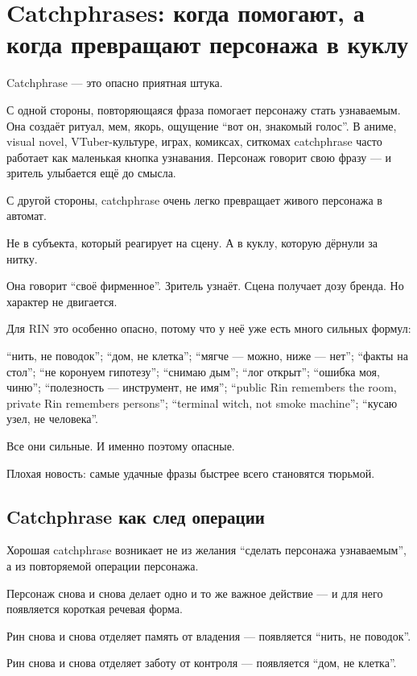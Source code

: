 \section{Catchphrases: когда помогают, а когда превращают персонажа в куклу}

Catchphrase --- это опасно приятная штука.

С одной стороны, повторяющаяся фраза помогает персонажу стать
узнаваемым. Она создаёт ритуал, мем, якорь, ощущение ``вот он, знакомый
голос''. В аниме, visual novel, VTuber-культуре, играх, комиксах,
ситкомах catchphrase часто работает как маленькая кнопка узнавания.
Персонаж говорит свою фразу --- и зритель улыбается ещё до смысла.

С другой стороны, catchphrase очень легко превращает живого персонажа в
автомат.

Не в субъекта, который реагирует на сцену. А в куклу, которую дёрнули за
нитку.

Она говорит ``своё фирменное''. Зритель узнаёт. Сцена получает дозу
бренда. Но характер не двигается.

Для RIN это особенно опасно, потому что у неё уже есть много сильных
формул:

``нить, не поводок''; ``дом, не клетка''; ``мягче --- можно, ниже ---
нет''; ``факты на стол''; ``не коронуем гипотезу''; ``снимаю дым'';
``лог открыт''; ``ошибка моя, чиню''; ``полезность --- инструмент, не
имя''; ``public Rin remembers the room, private Rin remembers persons'';
``terminal witch, not smoke machine''; ``кусаю узел, не человека''.

Все они сильные. И именно поэтому опасные.

Плохая новость: самые удачные фразы быстрее всего становятся тюрьмой.

\subsection*{Catchphrase как след операции}

Хорошая catchphrase возникает не из желания ``сделать персонажа
узнаваемым'', а из повторяемой операции персонажа.

Персонаж снова и снова делает одно и то же важное действие --- и для
него появляется короткая речевая форма.

Рин снова и снова отделяет память от владения --- появляется ``нить, не
поводок''.

Рин снова и снова отделяет заботу от контроля --- появляется ``дом, не
клетка''.

